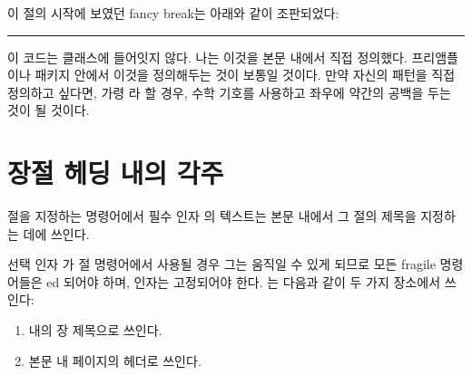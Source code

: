 이 절의 시작에 보였던 fancy break는 아래와 같이 조판되었다:
\begin{lcode}
\fancybreak{\chain{\diamonds}{0.25\textwidth}}
\end{lcode}
이 코드는  클래스에 들어잇지 않다.
나는 이것을 본문 내에서 직접 정의했다.
프리앰플이나 패키지 안에서 이것을 정의해두는 것이 보통일 것이다.
만약 자신의 패턴을 직접 정의하고 싶다면, 가령 라 할 경우,
\cmd{\club} 수학 기호를 사용하고 좌우에 약간의 공백을 두는 것이 될 것이다.



\section{장절 헤딩 내의 각주}


절을 지정하는 명령어에서 필수 인자 의 텍스트는
본문 내에서 그 절의 제목을 지정하는 데에 쓰인다.

선택 인자 가 절 명령어에서 사용될 경우
그는 움직일 수 있게 되므로
모든 fragile 명령어들은
\cmd{\protect}ed 되어야 하며,
 인자는 고정되어야 한다.
는 다음과 같이 두 가지 장소에서 쓰인다:
\begin{enumerate}
	\item \toc 내의 장 제목으로 쓰인다.
	\item 본문 내 페이지의 헤더로 쓰인다.
\end{enumerate}



